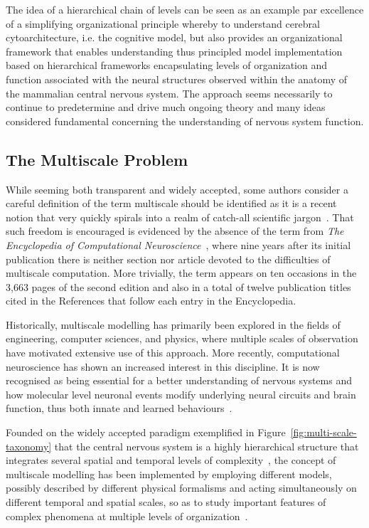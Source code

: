 \documentclass[11pt,3p,twocolumn]{JMN}
\begin{document}
The idea of a hierarchical chain of levels can be seen as an example par excellence of a simplifying organizational principle whereby to understand cerebral cytoarchitecture, i.e. the cognitive model, but also provides an organizational framework that enables understanding thus principled model implementation based on hierarchical frameworks encapsulating levels of organization and function associated with the neural structures observed within the anatomy of the mammalian central nervous system. The approach seems necessarily to continue to predetermine and drive much ongoing theory and many ideas considered fundamental concerning the understanding of nervous system function.

\subsection{The Multiscale Problem}
While seeming both transparent and widely accepted, some authors consider a careful definition of the term multiscale should be identified as it is a recent notion that very quickly spirals into a realm of catch-all scientific jargon~\citep[for example][]{walpole13}. That such freedom is encouraged is evidenced by the absence of the term from \textit{The Encyclopedia of Computational Neuroscience}~\citep{jung22}, where nine years after its initial publication there is neither section nor article devoted to the difficulties of multiscale computation. More trivially, the term appears on ten occasions in the 3,663 pages of the second edition and also in a total of twelve publication titles cited in the References that follow each entry in the Encyclopedia.

Historically, multiscale modelling has primarily been explored in the fields of engineering, computer sciences, and physics, where multiple scales of observation have motivated extensive use of this approach. More recently, computational neuroscience has shown an increased interest in this discipline. It is now recognised as being essential for a better understanding of nervous systems and how molecular level neuronal events modify underlying neural circuits and brain function, thus both innate and learned behaviours~\citep{bouteiller11}.

Founded on the widely accepted paradigm exemplified in Figure~\ref{fig:multi-scale-taxonomy} that the central nervous system is a highly hierarchical structure that integrates several spatial and temporal levels of complexity~\citep{bouteiller11}, the concept of multiscale modelling has been implemented by employing different models, possibly described by different physical formalisms and acting simultaneously on different temporal and spatial scales, so as to study important features of complex phenomena at multiple levels of organization~\citep{djurfeldt07}.
\end{document}
